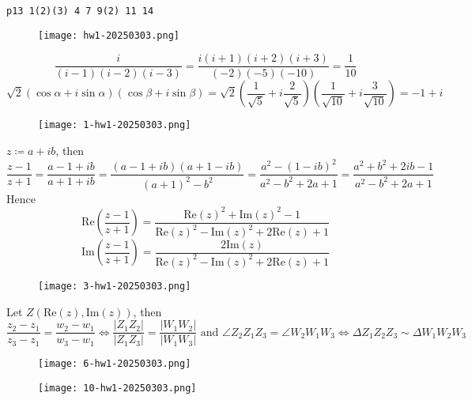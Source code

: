 \begin{lstlisting}
p13 1(2)(3) 4 7 9(2) 11 14 
\end{lstlisting}
\begin{exercise}
\begin{figure}[H]
\centering
\texttt{[image: hw1-20250303.png]}
\label{}
\end{figure}
\end{exercise}
\[
\frac{i}{(i-1)(i-2)(i-3)}=\frac{i(i+1)(i+2)(i+3)}{(-2)(-5)(-10)}= \frac{1}{10}
\]
\[
\sqrt{ 2 }(\cos\alpha+i\sin\alpha)(\cos\beta+i\sin\beta)=\sqrt{ 2 }\left( \frac{1}{\sqrt{ 5 }} +i \frac{2}{\sqrt{ 5 }}  \right)\left( \frac{1}{\sqrt{ 10 }} +i \frac{3}{\sqrt{ 10 }}  \right)=-1+i 
\]
\begin{exercise}
\begin{figure}[H]
\centering
\texttt{[image: 1-hw1-20250303.png]}
\label{}
\end{figure}
\end{exercise}
$z\coloneqq a+ib$, then
\[
\frac{z-1}{z+1}=\frac{a-1+ib}{a+1+ib}=\frac{(a-1+ib)(a+1-ib)}{(a+1)^{2}-b^{2}}=\frac{a^{2}-(1-ib)^{2}}{a^{2}-b^{2}+2a+1}=\frac{a^{2}+b^{2}+2ib-1}{a^{2}-b^{2}+2a+1}
\]
Hence
\[
\mathrm{Re}\left( \frac{z-1}{z+1} \right)=\frac{\mathrm{Re}(z)^{2}+\mathrm{Im}(z)^{2}-1}{\mathrm{Re}(z)^{2}-\mathrm{Im}(z)^{2}+2\mathrm{Re}(z)+1}
\]
\[
\mathrm{Im}\left( \frac{z-1}{z+1} \right)=\frac{2\mathrm{Im}(z)}{\mathrm{Re}(z)^{2}-\mathrm{Im}(z)^{2}+2\mathrm{Re}(z)+1}
\]
\begin{exercise}
\begin{figure}[H]
\centering
\texttt{[image: 3-hw1-20250303.png]}
\label{}
\end{figure}
\end{exercise}
Let $Z(\mathrm{Re}(z),\mathrm{Im}(z))$, then
\[
\frac{z_{2}-z_{1}}{z_{3}-z_{1}}=\frac{w_{2}-w_{1}}{w_{3}-w_{1}}\iff\frac{\lvert Z_{1}Z_{2} \rvert }{\lvert Z_1Z_{3} \rvert }=\frac{\lvert W_{1}W_{2} \rvert }{\lvert W_{1}W_{3} \rvert }\text{ and }\angle Z_{2}Z_{1}Z_{3}=\angle W_{2}W_{1}W_{3}\iff \Delta Z_{1}Z_{2}Z_{3}\sim \Delta W_{1}W_{2}W_{3}
\]
\begin{exercise}
\begin{figure}[H]
\centering
\texttt{[image: 6-hw1-20250303.png]}
\label{}
\end{figure}
\end{exercise}
\begin{definition}[棣莫弗公式]
\begin{figure}[H]
\centering
\texttt{[image: 10-hw1-20250303.png]}
\label{}
\end{figure}
\end{definition}
